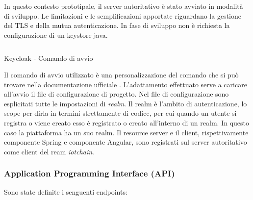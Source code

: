 \documentclass[a4paper,11pt]{article}
\begin{document}
In questo contesto prototipale, il server autoritativo è stato avviato in modalità di sviluppo. Le limitazioni e le semplificazioni apportate riguardano la gestione del TLS e della mutua autenticazione. In fase di sviluppo non è richiesta la configurazione di un keystore java.

\begin{listing}
  \inputminted{bash}{./code/avvio.kc.sh}
  \caption{Keycloak - Comando di avvio}
  \label{listing:avviokc}
\end{listing}

Il comando di avvio utilizzato è una personalizzazione del comando che si può trovare nella documentazione ufficiale \cite{keycloakDockerKeycloak}. L'adattamento effettuato serve a caricare all'avvio il file di configurazione di progetto. Nel file di configurazione sono esplicitati tutte le impostazioni di \textit{realm}. Il realm è l'ambito di autenticazione, lo scope per dirla in termini strettamente di codice, per cui quando un utente si registra o viene creato esso è registrato o creato all'interno di un realm. In questo caso la piattaforma ha un suo realm. Il resource server e il client, rispettivamente componente Spring e componente Angular, sono registrati sul server autoritativo come client del ream \textit{iotchain}.

\subsubsection{Application Programming Interface (API)}

Sono state definite i senguenti endpoints:
\end{document}
